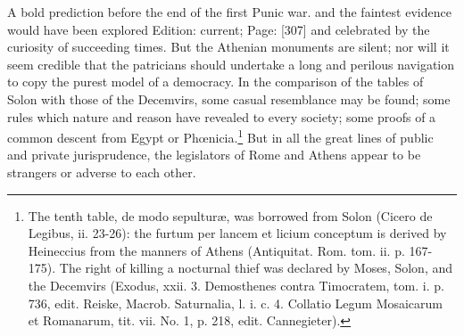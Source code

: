 {{}A bold prediction before the end of the first Punic war.} and the faintest evidence would have been explored Edition: current; Page: [307] and celebrated by the curiosity of succeeding times. But the Athenian monuments are silent; nor will it seem credible that the patricians should undertake a long and perilous navigation to copy the purest model of a democracy. In the comparison of the tables of Solon with those of the Decemvirs, some casual resemblance may be found; some rules which nature and reason have revealed to every society; some proofs of a common descent from Egypt or Phœnicia.\footnote{The tenth table, de modo sepulturæ, was borrowed from Solon (Cicero de Legibus, ii. 23-26): the furtum per lancem et licium conceptum is derived by Heineccius from the manners of Athens (Antiquitat. Rom. tom. ii. p. 167-175). The right of killing a nocturnal thief was declared by Moses, Solon, and the Decemvirs (Exodus, xxii. 3. Demosthenes contra Timocratem, tom. i. p. 736, edit. Reiske, Macrob. Saturnalia, l. i. c. 4. Collatio Legum Mosaicarum et Romanarum, tit. vii. No. 1, p. 218, edit. Cannegieter).} But in all the great lines of public and private jurisprudence, the legislators of Rome and Athens appear to be strangers or adverse to each other.


